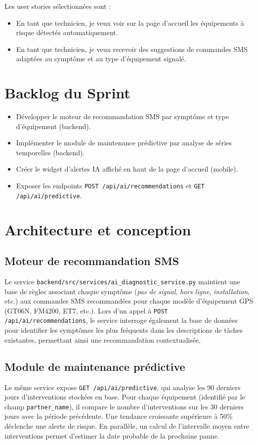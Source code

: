 \documentclass[12pt,a4paper]{report}
\begin{document}
\noindent Les user stories sélectionnées sont :
\begin{itemize}
    \item En tant que technicien, je veux voir sur la page d'accueil les équipements à risque détectés automatiquement.
    \item En tant que technicien, je veux recevoir des suggestions de commandes SMS adaptées au symptôme et au type d'équipement signalé.
\end{itemize}

\section{Backlog du Sprint}
\begin{itemize}
    \item Développer le moteur de recommandation SMS par symptôme et type d'équipement (backend).
    \item Implémenter le module de maintenance prédictive par analyse de séries temporelles (backend).
    \item Créer le widget d'alertes IA affiché en haut de la page d'accueil (mobile).
    \item Exposer les endpoints \texttt{POST /api/ai/recommendations} et \texttt{GET /api/ai/predictive}.
\end{itemize}

\section{Architecture et conception}

\subsection{Moteur de recommandation SMS}
\noindent Le service \texttt{backend/src/services/ai\_diagnostic\_service.py} maintient une base de règles associant chaque symptôme (\textit{pas de signal}, \textit{hors ligne}, \textit{installation}, etc.) aux commandes SMS recommandées pour chaque modèle d'équipement GPS (GT06N, FM4200, ET7, etc.). Lors d'un appel à \texttt{POST /api/ai/recommendations}, le service interroge également la base de données pour identifier les symptômes les plus fréquents dans les descriptions de tâches existantes, permettant ainsi une recommandation contextualisée.

\subsection{Module de maintenance prédictive}
\noindent Le même service expose \texttt{GET /api/ai/predictive}, qui analyse les 90 derniers jours d'interventions stockées en base. Pour chaque équipement (identifié par le champ \texttt{partner\_name}), il compare le nombre d'interventions sur les 30 derniers jours avec la période précédente. Une tendance croissante supérieure à 50\% déclenche une alerte de risque. En parallèle, un calcul de l'intervalle moyen entre interventions permet d'estimer la date probable de la prochaine panne.
\end{document}
